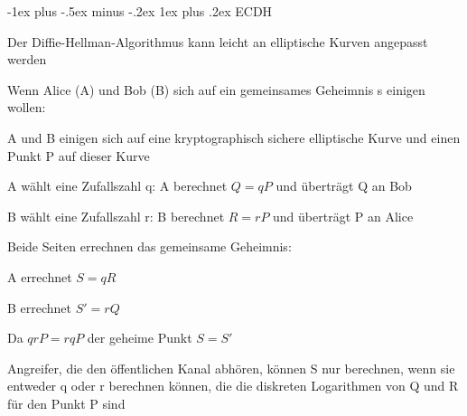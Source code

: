 \documentclass[a4paper]{article}
\makeatletter
\renewcommand{\subsubsection}{\@startsection{subsubsection}{3}{0mm}%
 {-1ex plus -.5ex minus -.2ex}%
 {1ex plus .2ex}%
 {\normalfont\small\bfseries}}
\makeatother
\begin{document}
\begin{multicols}{3}
      \subsubsection{ECDH}
      \begin{itemize*}
            \item Der Diffie-Hellman-Algorithmus kann leicht an elliptische Kurven angepasst werden
            \item Wenn Alice (A) und Bob (B) sich auf ein gemeinsames Geheimnis s einigen wollen:
            \begin{itemize*}
                  \item A und B einigen sich auf eine kryptographisch sichere elliptische Kurve und einen Punkt P auf dieser Kurve
                  \item A wählt eine Zufallszahl q: A berechnet $Q=qP$ und überträgt Q an Bob
                  \item B wählt eine Zufallszahl r: B berechnet $R=rP$ und überträgt P an Alice
                  \item Beide Seiten errechnen das gemeinsame Geheimnis:
                  \begin{itemize*}
                        \item A errechnet $S=qR$
                        \item B errechnet $S'=rQ$
                        \item Da $qrP=rqP$ der geheime Punkt $S=S'$
                  \end{itemize*}
            \end{itemize*}
            \item Angreifer, die den öffentlichen Kanal abhören, können S nur berechnen, wenn sie entweder q oder r berechnen können, die die diskreten Logarithmen von Q und R für den Punkt P sind
      \end{itemize*}


\end{multicols}
\end{document}

